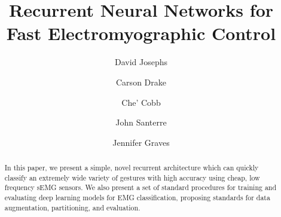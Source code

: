 \documentclass{llncs}
\title{Recurrent Neural Networks for Fast Electromyographic Control}
\author{%
David Josephs\inst{1} \and
Carson Drake\inst{1} \and
Che' Cobb\inst{1} \and
John Santerre\inst{1} \and
Jennifer Graves %
}
\institute{
Master of Science in Data Science, Southern Methodist University,
Dallas TX 75275 USA 
\email{\{josephsd, drakec, cobbc\}@smu.edu} %
}
\begin{document}
\maketitle              %

\setcounter{footnote}{0}
\begin{abstract} 
In this paper, we present a simple, novel recurrent architecture which can quickly classify an extremely wide variety of gestures with high accuracy using cheap, low frequency sEMG sensors. We also present a set of standard procedures for training and evaluating deep learning models for EMG classification, proposing standards for data augmentation, partitioning, and evaluation.
%
%
%
%




\end{abstract}
\end{document}
